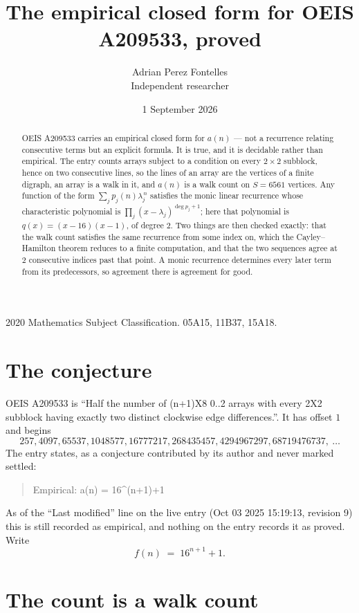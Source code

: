\documentclass[11pt,a4paper]{article}
\title{The empirical closed form for OEIS A209533, proved}
\author{Adrian Perez Fontelles\\ \small Independent researcher}
\date{1 September 2026}
\theoremstyle{plain}
\theoremstyle{definition}
\begin{document}
\maketitle

\begin{abstract}
OEIS A209533 carries an empirical closed form for $a(n)$ --- not a recurrence relating
consecutive terms but an explicit formula. It is true, and it is decidable rather than
empirical. The entry counts arrays subject to a condition on every $2\times2$ subblock, hence on two consecutive lines, so the lines of an array are the
vertices of a finite digraph, an array is a walk in it, and $a(n)$ is a walk count on
$S=6561$ vertices. Any function of the form $\sum_j p_j(n)\lambda_j^{\,n}$ satisfies the
monic linear recurrence whose characteristic polynomial is
$\prod_j(x-\lambda_j)^{\deg p_j+1}$; here that polynomial is $q(x)=(x-16)(x-1)$, of degree
$2$. Two things are then checked exactly: that the walk count satisfies the same
recurrence from some index on, which the Cayley--Hamilton theorem reduces to a finite
computation, and that the two sequences agree at $2$ consecutive indices past that
point. A monic recurrence determines every later term from its predecessors, so agreement
there is agreement for good.
\end{abstract}

\noindent\small 2020 Mathematics Subject Classification. 05A15, 11B37, 15A18.\normalsize

\section{The conjecture}

OEIS A209533 is ``Half the number of (n+1)X8 0..2 arrays with every 2X2 subblock having exactly two distinct clockwise edge differences.''. It has offset $1$ and begins
\[
257, 4097, 65537, 1048577, 16777217, 268435457, 4294967297, 68719476737,\ \dots
\]
The entry states, as a conjecture contributed by its author and never marked settled:
\begin{quote}
Empirical: a(n) = 16\^{}(n+1)+1
\end{quote}
As of the ``Last modified'' line on the live entry (Oct 03 2025 15:19:13, revision 9) this is still
recorded as empirical, and nothing on the entry records it as proved. Write
\[
f(n)\;=\;16^{n + 1} + 1.
\]

\section{The count is a walk count}
\end{document}
